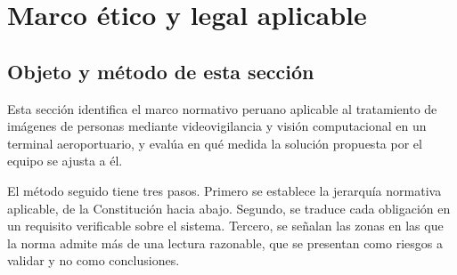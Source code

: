 %
\section{Marco ético y legal aplicable}
\label{sec:marco}

\subsection{Objeto y método de esta sección}
\label{sec:marco-metodo}

Esta sección identifica el marco normativo peruano aplicable al
tratamiento de imágenes de personas mediante videovigilancia y visión
computacional en un terminal aeroportuario, y evalúa en qué medida la
solución propuesta por el equipo se ajusta a él.

El método seguido tiene tres pasos. Primero se establece la jerarquía
normativa aplicable, de la Constitución hacia abajo. Segundo, se traduce
cada obligación en un requisito verificable sobre el sistema. Tercero, se
señalan las zonas en las que la norma admite más de una lectura
razonable, que se presentan como riesgos a validar y no como conclusiones.


